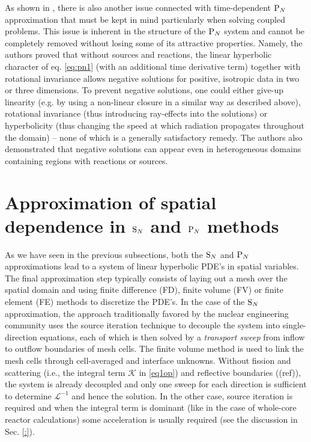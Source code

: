 As shown in \cite{McClarren4}, there is also another issue connected with time-dependent $\text{P}_{N}$ approximation that must
be kept in mind particularly when solving coupled problems. This issue is inherent in the structure of the $\text{P}_{N}$ system
and cannot be completely removed without losing some of its attractive properties. Namely, the authors proved that
without sources and reactions, the linear hyperbolic character of eq. \eqref{eq:pn1} (with an additional time derivative
term) together with rotational invariance allows negative solutions for positive, isotropic data in two or three
dimensions. To prevent negative solutions, one could either give-up linearity (e.g. by using a non-linear closure in a
similar way as described above), rotational invariance (thus introducing ray-effects into the solutions) or
hyperbolicity (thus changing the speed at which radiation propagates throughout the domain) -- none of which is a
generally satisfactory remedy. The authors also demonstrated that negative solutions can appear even in heterogeneous
domains containing regions with reactions or sources.

\section{Approximation of spatial dependence in $\text{S}_{N}$ and $\text{P}_{N}$ methods}
As we have seen in the previous subsections, both the $\text{S}_{N}$ and $\text{P}_{N}$ approximations lead to a system of linear
hyperbolic PDE's in spatial variables. The final approximation step typically consists of laying out a mesh over the
spatial domain and using finite difference (FD), finite volume (FV) or finite element (FE) methods to discretize the
PDE's. In the case of the $\text{S}_{N}$ approximation, the approach traditionally favored by the nuclear engineering community
uses the source iteration technique to decouple the system into single-direction equations, each of which is then solved
by a \textit{transport sweep} from inflow to outflow boundaries of mesh cells. The finite volume method is used to link
the mesh cells through cell-averaged and interface unknowns. Without fission and scattering (i.e., the integral term
$\mathcal{K}$ in \eqref{eq1op}) and reflective boundaries (\alert(ref)), the system is already decoupled and only one
sweep for each direction is sufficient to determine $\mathcal{L}^{-1}$ and hence the solution. In the other case, source
iteration is required and when the integral term is dominant (like in the case of whole-core reactor calculations) some
acceleration is usually required (see the discussion in Sec. \ref{:}).

